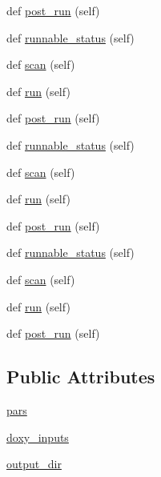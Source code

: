 \begin{DoxyCompactItemize}
def \hyperlink{classwaflib_1_1extras_1_1doxygen_1_1doxygen_a62a09f0a46cbab7cffab4ab496c46e80}{post\+\_\+run} (self)
\item 
def \hyperlink{classwaflib_1_1extras_1_1doxygen_1_1doxygen_a9296bc8174969eb9d34a207086b25979}{runnable\+\_\+status} (self)
\item 
def \hyperlink{classwaflib_1_1extras_1_1doxygen_1_1doxygen_a429bd9d2361167ffbe527e4dd944bf38}{scan} (self)
\item 
def \hyperlink{classwaflib_1_1extras_1_1doxygen_1_1doxygen_adfbde18b61a6ae5e0af7ff252af4dcf5}{run} (self)
\item 
def \hyperlink{classwaflib_1_1extras_1_1doxygen_1_1doxygen_a62a09f0a46cbab7cffab4ab496c46e80}{post\+\_\+run} (self)
\item 
def \hyperlink{classwaflib_1_1extras_1_1doxygen_1_1doxygen_a9296bc8174969eb9d34a207086b25979}{runnable\+\_\+status} (self)
\item 
def \hyperlink{classwaflib_1_1extras_1_1doxygen_1_1doxygen_a429bd9d2361167ffbe527e4dd944bf38}{scan} (self)
\item 
def \hyperlink{classwaflib_1_1extras_1_1doxygen_1_1doxygen_adfbde18b61a6ae5e0af7ff252af4dcf5}{run} (self)
\item 
def \hyperlink{classwaflib_1_1extras_1_1doxygen_1_1doxygen_a62a09f0a46cbab7cffab4ab496c46e80}{post\+\_\+run} (self)
\item 
def \hyperlink{classwaflib_1_1extras_1_1doxygen_1_1doxygen_a9296bc8174969eb9d34a207086b25979}{runnable\+\_\+status} (self)
\item 
def \hyperlink{classwaflib_1_1extras_1_1doxygen_1_1doxygen_a429bd9d2361167ffbe527e4dd944bf38}{scan} (self)
\item 
def \hyperlink{classwaflib_1_1extras_1_1doxygen_1_1doxygen_adfbde18b61a6ae5e0af7ff252af4dcf5}{run} (self)
\item 
def \hyperlink{classwaflib_1_1extras_1_1doxygen_1_1doxygen_a62a09f0a46cbab7cffab4ab496c46e80}{post\+\_\+run} (self)
\end{DoxyCompactItemize}
\subsection*{Public Attributes}
\begin{DoxyCompactItemize}
\item 
\hyperlink{classwaflib_1_1extras_1_1doxygen_1_1doxygen_a431448bf1c1cb60dbf666faa1ec27bfb}{pars}
\item 
\hyperlink{classwaflib_1_1extras_1_1doxygen_1_1doxygen_a87228c743c24595457bd87f01f36c7fd}{doxy\+\_\+inputs}
\item 
\hyperlink{classwaflib_1_1extras_1_1doxygen_1_1doxygen_a6dda9f470be0c485902a1ede0801cf14}{output\+\_\+dir}
\end{DoxyCompactItemize}
